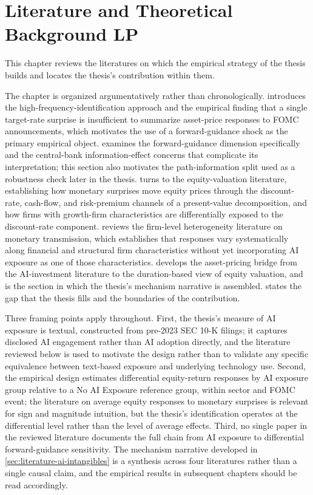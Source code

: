 \chapter{Literature and Theoretical Background LP}
\label{ch:literature1}

This chapter reviews the literatures on which the empirical strategy
of the thesis builds and locates the thesis's contribution within
them.

The chapter is organized argumentatively rather than chronologically.
 introduces the high-frequency-identification
approach and the empirical finding that a single target-rate surprise
is insufficient to summarize asset-price responses to FOMC announcements,
which motivates the use of a forward-guidance shock as the primary
empirical object.  examines the
forward-guidance dimension specifically and the central-bank
information-effect concerns that complicate its interpretation; this
section also motivates the path-information split used as a robustness
check later in the thesis. 
turns to the equity-valuation literature, establishing how monetary
surprises move equity prices through the discount-rate, cash-flow,
and risk-premium channels of a present-value decomposition, and how
firms with growth-firm characteristics are differentially exposed to
the discount-rate component. 
reviews the firm-level heterogeneity literature on monetary
transmission, which establishes that responses vary systematically
along financial and structural firm characteristics without yet
incorporating AI exposure as one of those characteristics.
 develops the asset-pricing
bridge from the AI-investment literature to the duration-based view
of equity valuation, and is the section in which the thesis's
mechanism narrative is assembled.  states
the gap that the thesis fills and the boundaries of the contribution.

Three framing points apply throughout. First, the thesis's measure of
AI exposure is textual, constructed from pre-2023 SEC 10-K filings;
it captures disclosed AI engagement rather than AI adoption directly,
and the literature reviewed below is used to motivate the design
rather than to validate any specific equivalence between text-based
exposure and underlying technology use. Second, the empirical design
estimates differential equity-return responses by AI exposure group
relative to a No AI Exposure reference group, within sector and FOMC
event; the literature on average equity responses to monetary
surprises is relevant for sign and magnitude intuition, but the
thesis's identification operates at the differential level rather
than the level of average effects. Third, no single paper in the
reviewed literature documents the full chain from AI exposure to
differential forward-guidance sensitivity. The mechanism narrative
developed in \cref{sec:literature-ai-intangibles} is a synthesis
across four literatures rather than a single causal claim, and the
empirical results in subsequent chapters should be read accordingly.

